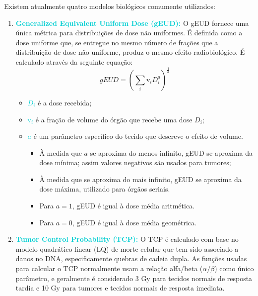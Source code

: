 \documentclass[11pt,a4paper]{article}
\newcounter{exemplo}
\begin{document}
	Existem atualmente quatro modelos biológicos comumente utilizados:

	\begin{enumerate}
		\item \textcolor{DarkTurquoise}{\textbf{Generalized Equivalent Uniform Dose (gEUD):}} O gEUD fornece uma única métrica para distribuições de dose não uniformes. É definida como a dose uniforme que, se entregue no mesmo número de frações que a distribuição de dose não uniforme, produz o mesmo efeito radiobiológico. É calculado através da seguinte equação:
			\begin{equation}
				gEUD = \left(\sum_i \mathrm{v}_i D_i^a\right)^{\frac{1}{a}}
			\end{equation}

			\begin{exemplo}[onde,]
				\begin{itemize}[label=\textcolor{CarnationPink}{$\blacksquare$}]
					\item \textcolor{DarkTurquoise}{\textbf{$D_i$}} é a dose recebida;
					\item \textcolor{DarkTurquoise}{\textbf{$\mathrm{v}_i$}} é a fração de volume do órgão que recebe uma dose $D_i$;
					\item \textcolor{DarkTurquoise}{\textbf{$a$}} é um parâmetro específico do tecido que descreve o efeito de volume.
						\begin{itemize}[label=\textcolor{CarnationPink}{$\star$}]
							\item À medida que $a$ se aproxima do menos infinito, gEUD se aproxima da dose mínima; assim valores negativos são usados para tumores;
					
							\item À medida que se aproxima do mais infinito, gEUD se aproxima da dose máxima, utilizado para órgãos seriais.
					
							\item Para $a = 1$, gEUD é igual à dose média aritmética.
					
							\item Para $a = 0$, gEUD é igual à dose média geométrica.
						\end{itemize}
				\end{itemize}
			\end{exemplo}

		\item \textcolor{DarkTurquoise}{\textbf{Tumor Control Probability (TCP):}} O TCP é calculado com base no modelo quadrático linear (LQ) de morte celular que tem sido associado a danos no DNA, especificamente quebras de cadeia dupla. As funções usadas para calcular o TCP normalmente usam a relação alfa/beta ($\alpha / \beta$) como único parâmetro, e geralmente é considerado 3 Gy para tecidos normais de resposta tardia e 10 Gy para tumores e tecidos normais de resposta imediata.
		

\end{enumerate}
\end{document}
